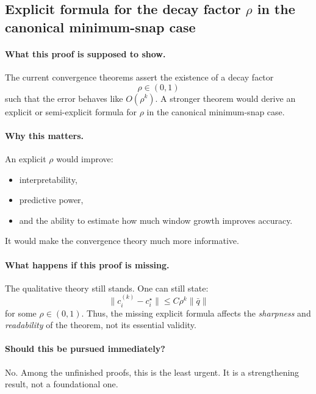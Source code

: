\subsection{Explicit formula for the decay factor \texorpdfstring{$\rho$}{rho} in the canonical minimum-snap case}
\label{subsec:unfinished_explicit_rho}

\paragraph{What this proof is supposed to show.}
The current convergence theorems assert the existence of a decay factor
\[
\rho\in(0,1)
\]
such that the error behaves like \(O(\rho^k)\).
A stronger theorem would derive an explicit or semi-explicit formula for \(\rho\) in the canonical minimum-snap case.

\paragraph{Why this matters.}
An explicit \(\rho\) would improve:
\begin{itemize}
	\item interpretability,
	\item predictive power,
	\item and the ability to estimate how much window growth improves accuracy.
\end{itemize}
It would make the convergence theory much more informative.

\paragraph{What happens if this proof is missing.}
The qualitative theory still stands.
One can still state:
\[
\|c_i^{(k)}-c_i^\star\|\le C\rho^k\|\bar q\|
\]
for some \(\rho\in(0,1)\).
Thus, the missing explicit formula affects the \emph{sharpness} and \emph{readability} of the theorem, not its essential validity.

\paragraph{Should this be pursued immediately?}
No.
Among the unfinished proofs, this is the least urgent.
It is a strengthening result, not a foundational one.

